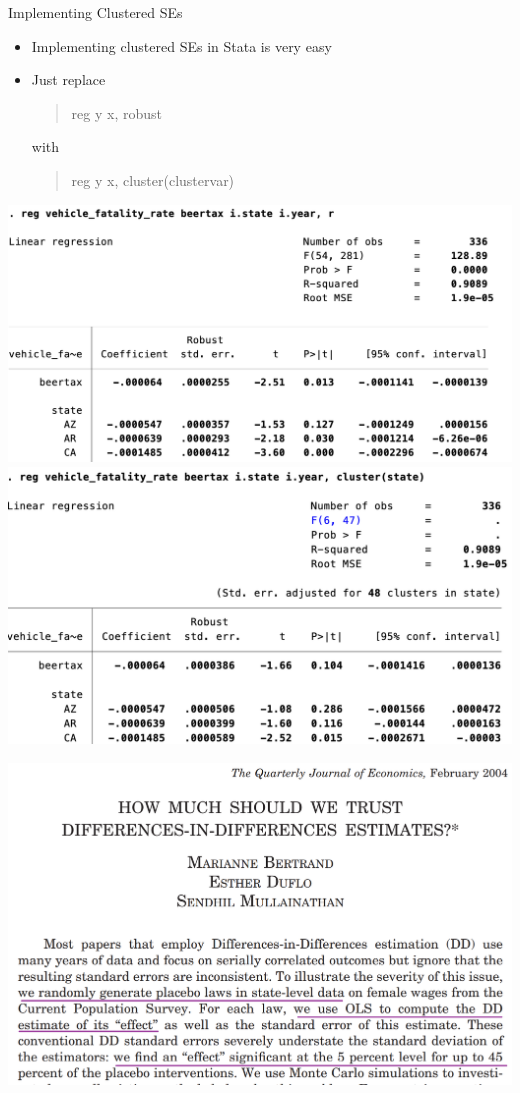 \documentclass[11pt,english,handout]{beamer}
\begin{document}
\begin{frame}{Implementing Clustered SEs}
	\begin{itemize}
		\item 
		Implementing clustered SEs in Stata is very easy
		
		\item
		Just replace
		
		\begin{quote}
			reg y x, robust
		\end{quote}
	
		\noindent with \\
		
			\begin{quote}
			reg y x, cluster(clustervar)
		\end{quote}
		
	\end{itemize}

\end{frame}

\begin{frame}
		\includegraphics[width = 0.7 \linewidth]{beer-tax1}
	\medskip 
		\includegraphics[width = 0.7 \linewidth]{beer-tax2}
	
\end{frame}

\begin{frame}
	\centering
	\includegraphics[width = 0.7\linewidth]{bdm04}
\end{frame}
\end{document}
